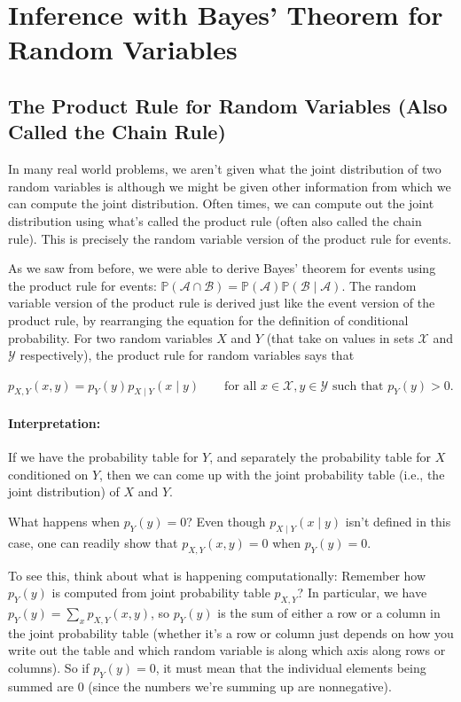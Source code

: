 \documentclass[6008notes.tex]{subfiles}
\begin{document}
\graphicspath{ {images/infbayes/} }

\section{Inference with Bayes' Theorem for Random Variables}

\subsection{The Product Rule for Random Variables (Also Called the Chain Rule)}

In many real world problems, we aren't given what the joint distribution of two random variables is although we might be given other information from which we can compute the joint distribution. Often times, we can compute out the joint distribution using what's called the product rule (often also called the chain rule). This is precisely the random variable version of the product rule for events.

As we saw from before, we were able to derive Bayes' theorem for events using the product rule for events: $\mathbb {P}(\mathcal{A} \cap \mathcal{B}) = \mathbb {P}(\mathcal{A}) \mathbb {P}(\mathcal{B} \mid \mathcal{A})$. The random variable version of the product rule is derived just like the event version of the product rule, by rearranging the equation for the definition of conditional probability. For two random variables $X$ and $Y$ (that take on values in sets $\mathcal{X}$ and $\mathcal{Y}$ respectively), the product rule for random variables says that

{\centering$p_{X,Y}(x,y)=p_{Y}(y)p_{X\mid Y}(x\mid y)\qquad \text {for all }x\in \mathcal{X},y\in \mathcal{Y}\text { such that }p_{Y}(y)>0.$ \par}
 
\paragraph{Interpretation:} If we have the probability table for $Y$, and separately the probability table for $X$ conditioned on $Y$, then we can come up with the joint probability table (i.e., the joint distribution) of $X$ and $Y$.

What happens when $p_{Y}(y)=0$? Even though $p_{X\mid Y}(x\mid y)$ isn't defined in this case, one can readily show that $p_{X,Y}(x,y)=0$ when $p_{Y}(y)=0$.

To see this, think about what is happening computationally: Remember how $p_Y(y)$ is computed from joint probability table $p_{X,Y}$? In particular, we have $p_{Y}(y)=\sum _{x}p_{X,Y}(x,y)$, so $p_Y(y)$ is the sum of either a row or a column in the joint probability table (whether it's a row or column just depends on how you write out the table and which random variable is along which axis along rows or columns). So if $p_{Y}(y)=0$, it must mean that the individual elements being summed are 0 (since the numbers we're summing up are nonnegative).
\end{document}
